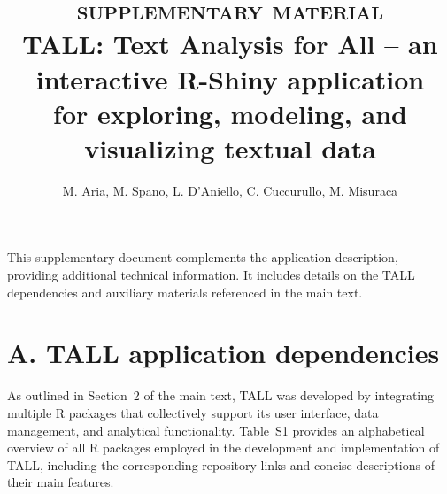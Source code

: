 \documentclass[8pt,a4paper]{article}
\title{\textsc{supplementary material}\\TALL: Text Analysis for All -- an interactive \textsf{R}-Shiny application\\for exploring, modeling, and visualizing textual data}
\author{M. Aria, M. Spano, L. D'Aniello, C. Cuccurullo, M. Misuraca}
\begin{document}
\maketitle

\renewcommand{\thetable}{S\arabic{table}}
\renewcommand{\thefigure}{S\arabic{figure}}

This supplementary document complements the application description, providing additional technical information. It includes details on the TALL dependencies and auxiliary materials referenced in the main text.

\section*{A. \quad TALL application dependencies}
As outlined in Section~2 of the main text, TALL was developed by integrating multiple \textsf{R} packages that collectively support its user interface, data management, and analytical functionality. Table~S1 provides an alphabetical overview of all \textsf{R} packages employed in the development and implementation of TALL, including the corresponding repository links and concise descriptions of their main features.
\end{document}
